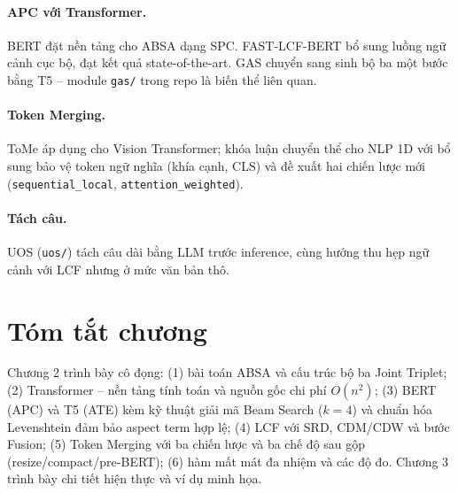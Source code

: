 \paragraph{APC với Transformer.} BERT \cite{devlin2019bert} đặt nền
tảng cho ABSA dạng SPC. FAST-LCF-BERT \cite{zeng2019lcf, li2020bertabsa}
bổ sung luồng ngữ cảnh cục bộ, đạt kết quả state-of-the-art. GAS
\cite{zhang2021gas} chuyển sang sinh bộ ba một bước bằng T5 -- module
\texttt{gas/} trong repo là biến thể liên quan.

\paragraph{Token Merging.} ToMe \cite{bolya2023tome} áp dụng cho Vision
Transformer; khóa luận chuyển thể cho NLP 1D với bổ sung bảo vệ token
ngữ nghĩa (khía cạnh, CLS) và đề xuất hai chiến lược mới
(\texttt{sequential\_local}, \texttt{attention\_weighted}).

\paragraph{Tách câu.} UOS (\texttt{uos/}) tách câu dài bằng LLM trước
inference, cùng hướng thu hẹp ngữ cảnh với LCF nhưng ở mức văn bản thô.

\section*{Tóm tắt chương}

Chương 2 trình bày cô đọng: (1) bài toán ABSA và cấu trúc bộ ba Joint
Triplet; (2) Transformer -- nền tảng tính toán và nguồn gốc chi phí
$O(n^2)$; (3) BERT (APC) và T5 (ATE) kèm kỹ thuật giải mã Beam Search
($k=4$) và chuẩn hóa Levenshtein đảm bảo aspect term hợp lệ; (4) LCF
với SRD, CDM/CDW và bước Fusion; (5) Token Merging với ba chiến lược
và ba chế độ sau gộp (resize/compact/pre-BERT); (6) hàm mất mát đa
nhiệm và các độ đo. Chương 3 trình bày chi tiết hiện thực và ví dụ
minh họa.
